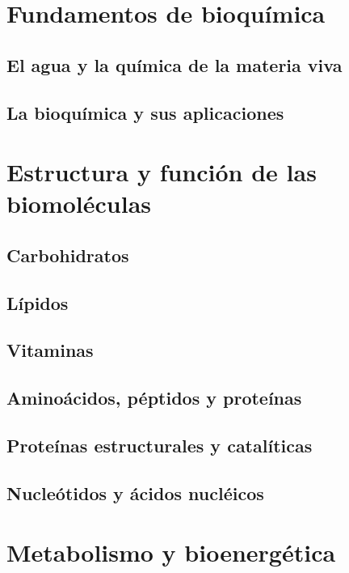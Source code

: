 \documentclass{AsignaturaResumen}
\begin{document}
    \frontmatter
    
\Portada    
\Indices

    \mainmatter
    

\part{Fundamentos de bioquímica}

    \chapter{El agua y la química de la materia viva}
    \chapter{La bioquímica y sus aplicaciones} 

\part{Estructura y función de las biomoléculas}

    \chapter{Carbohidratos} 
    \chapter{Lípidos} 
    \chapter{Vitaminas} 
    \chapter{Aminoácidos, péptidos y proteínas} 
    \chapter{Proteínas estructurales y catalíticas} 
    \chapter{Nucleótidos y ácidos nucléicos} 

\part{Metabolismo y bioenergética}
\end{document}
